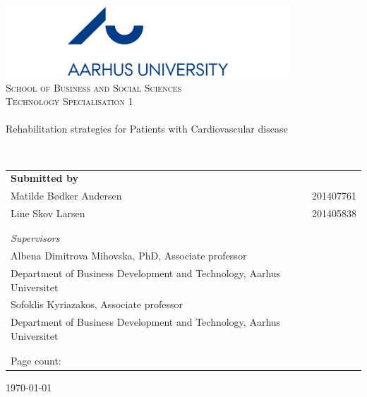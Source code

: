 \begin{titlingpage}
\begin{center}

~ \\[2.0cm]

\includegraphics[width=0.8\textwidth]{Figure/Ase} ~\\[0.5cm]

\textsc{\LARGE School of Business and Social Sciences}\\[0.5cm]

\textsc{\Large Technology Specialisation 1} ~\\[1.0cm]


\noindent\makebox[\linewidth]{\rule{\textwidth}{0.4pt}}\\
[0.5cm]{\Huge Rehabilitation strategies for Patients with Cardiovascular disease }
\noindent\makebox[\linewidth]{\rule{\textwidth}{0.4pt}}

\end{center}
~ \\[0.5cm]



\begin{table}[H]
\begin{tabular}{ll}
\textbf{Submitted by} & \\
Matilde Bødker Andersen  & 201407761 \\
Line Skov Larsen & 201405838 \\

\\ \\
\textit{Supervisors} & \\
Albena Dimitrova Mihovska, PhD, Associate professor & \\
Department of Business Development and Technology, Aarhus Universitet & \\[1ex]

Sofoklis Kyriazakos, Associate professor & \\
Department of Business Development and Technology, Aarhus Universitet & \\[1ex]
\\ \\
Page count: \pageref{LastPage} & \\
\end{tabular}
\end{table}
		

\vfill

\begin{center}
{\large \today}

\end{center}


\end{titlingpage}

\cleardoublepage